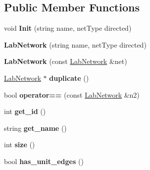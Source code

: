 \subsection*{Public Member Functions}
\begin{DoxyCompactItemize}
\item 
\hypertarget{classelps_1_1_lab_network_a27bf64f9378313b9533201daf70fa8d2}{void {\bfseries Init} (string name, net\-Type directed)}\label{classelps_1_1_lab_network_a27bf64f9378313b9533201daf70fa8d2}

\item 
\hypertarget{classelps_1_1_lab_network_aa16dcd790f67390e9f8038b7c67c97a5}{{\bfseries Lab\-Network} (string name, net\-Type directed)}\label{classelps_1_1_lab_network_aa16dcd790f67390e9f8038b7c67c97a5}

\item 
\hypertarget{classelps_1_1_lab_network_a9b8166a889554be6ef11642ee43a15f2}{{\bfseries Lab\-Network} (const \hyperlink{classelps_1_1_lab_network}{Lab\-Network} \&net)}\label{classelps_1_1_lab_network_a9b8166a889554be6ef11642ee43a15f2}

\item 
\hypertarget{classelps_1_1_lab_network_a91b9f6a674fffdeb4cb759596ef705b7}{\hyperlink{classelps_1_1_lab_network}{Lab\-Network} $\ast$ {\bfseries duplicate} ()}\label{classelps_1_1_lab_network_a91b9f6a674fffdeb4cb759596ef705b7}

\item 
\hypertarget{classelps_1_1_lab_network_a0d0e7a6d08d9503521377e906f88a97e}{bool {\bfseries operator==} (const \hyperlink{classelps_1_1_lab_network}{Lab\-Network} \&n2)}\label{classelps_1_1_lab_network_a0d0e7a6d08d9503521377e906f88a97e}

\item 
\hypertarget{classelps_1_1_lab_network_ac01befb26e5377313fceeaa0da1fb760}{int {\bfseries get\-\_\-id} ()}\label{classelps_1_1_lab_network_ac01befb26e5377313fceeaa0da1fb760}

\item 
\hypertarget{classelps_1_1_lab_network_a5fe226eca7093ffca9c599a7470af7b0}{string {\bfseries get\-\_\-name} ()}\label{classelps_1_1_lab_network_a5fe226eca7093ffca9c599a7470af7b0}

\item 
\hypertarget{classelps_1_1_lab_network_a26a22b913b68404c4f7db054983c0ce4}{int {\bfseries size} ()}\label{classelps_1_1_lab_network_a26a22b913b68404c4f7db054983c0ce4}

\item 
\hypertarget{classelps_1_1_lab_network_aec856778269f6d8ca7c0eac85f1d5e5a}{bool {\bfseries has\-\_\-unit\-\_\-edges} ()}\label{classelps_1_1_lab_network_aec856778269f6d8ca7c0eac85f1d5e5a}


\end{DoxyCompactItemize}
